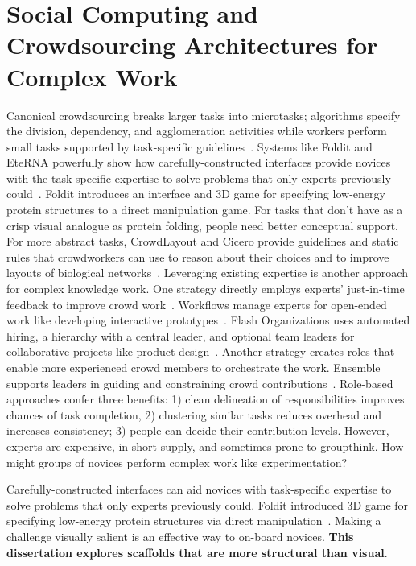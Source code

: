 \section{Social Computing and Crowdsourcing Architectures for Complex Work}
Canonical crowdsourcing breaks larger tasks into microtasks; algorithms specify the division,
dependency, and agglomeration activities while workers perform small tasks supported by task-specific
guidelines~\cite{kittur2012future}. Systems like Foldit and EteRNA powerfully show 
how carefully-constructed interfaces provide
novices with the task-specific expertise to solve problems that only experts previously 
could~\cite{Cooper2010, Lasecki2012, Lee2014, Zooniverse2007}. 
Foldit introduces an interface and 3D game for specifying low-energy protein structures
to a direct manipulation game. For tasks that don’t have as a crisp visual analogue as protein
folding, people need better conceptual support. For more abstract tasks, CrowdLayout and Cicero
provide guidelines and static rules that crowdworkers can use to reason about their choices and
to improve layouts of biological networks~\cite{Singh:2018:CCD:3173574.3173806, chen2019cicero}.
Leveraging existing expertise is another approach for complex knowledge work. One strategy
directly employs experts’ just-in-time feedback to improve crowd work~\cite{dow2012shepherding}. Workflows manage
experts for open-ended work like developing interactive prototypes~\cite{Retelny2014}. 
Flash Organizations uses automated hiring, a hierarchy with a central leader, and optional 
team leaders for collaborative projects like product design~\cite{Valentine2017}.
Another strategy creates roles that enable more experienced crowd members to orchestrate
the work. Ensemble supports leaders in guiding and constraining crowd 
contributions~\cite{Kim2014e}. Role-based approaches confer three benefits: 1) clean 
delineation of responsibilities improves chances of task completion, 2) clustering similar tasks 
reduces overhead and increases consistency; 3) people can decide their contribution levels. 
However, experts are expensive, in short supply, and sometimes prone to groupthink. 
How might groups of novices perform complex work like experimentation?

Carefully-constructed interfaces can aid novices with task-specific expertise to solve problems 
that only experts previously could. Foldit introduced 3D game for specifying low-energy protein 
structures via direct manipulation~\cite{Cooper2010}. Making a challenge visually salient is an 
effective way to on-board novices. \textbf{This dissertation explores scaffolds that are more structural than visual}.



